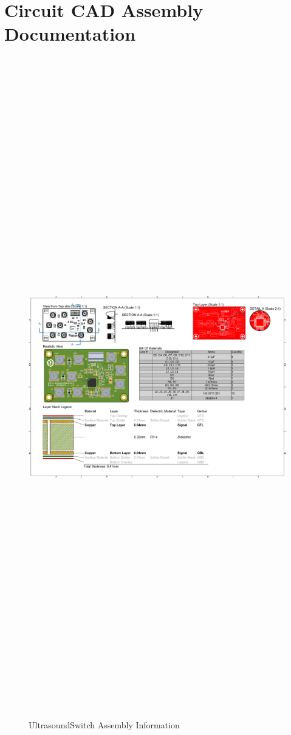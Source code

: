 \chapter{Circuit CAD Assembly Documentation}
\begin{landscape}
	\begin{figure}[htbp]
		\centering
		\includegraphics[width=20cm,height=28.7cm,keepaspectratio]{Figures/appendix/draftsman.pdf}
		\caption{UltrasoundSwitch Assembly Information}
		\label{fig:appendix_ultrasoundswitch_assembly}
	\end{figure}
\end{landscape}


